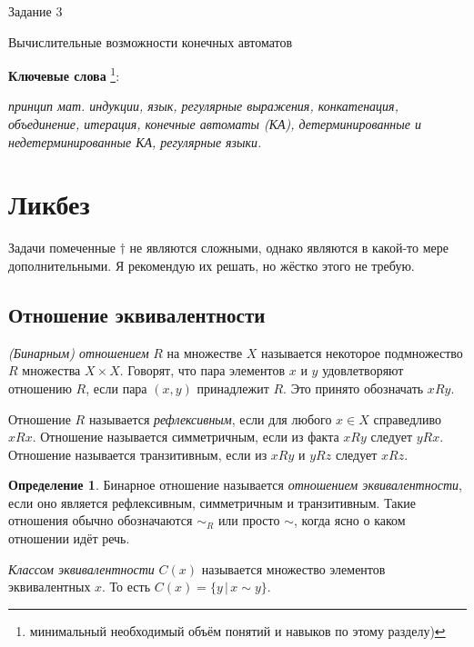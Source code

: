 \documentclass[12pt]{article}
\theoremstyle{definiton}
\theoremstyle{definition}
\theoremstyle{definition}
\newtheorem{Def}{Определение}
\begin{document}
	\centerline{\LARGE Задание 3}

	\medskip

	\centerline{\Large Вычислительные возможности конечных автоматов}

	\bigskip

	


	{\bf Ключевые слова }\footnote{минимальный необходимый объём понятий и навыков по
	этому разделу)}:{\em принцип мат. индукции, язык, регулярные выражения, конкатенация, объединение, итерация,  
	конечные автоматы (КА), детерминированные и недетерминированные КА, регулярные языки.

	}
	
	\setcounter{section}{-1}
	\section{Ликбез}
		Задачи помеченные $\dagger$ не являются сложными, однако являются в какой-то мере дополнительными. Я рекомендую их решать, но жёстко этого не требую.
		\subsection{Отношение эквивалентности}

		\emph{(Бинарным) отношением} $R$ на множестве $X$ называется некоторое подмножество $R$ множества $ X\times X$.
		Говорят, что пара элементов $x$ и $y$ удовлетворяют отношению $R$, если пара $(x,y)$ принадлежит $R$. Это принято обозначать $xRy$.


			Отношение $R$ называется \emph{рефлексивным}, если для любого $x \in X$ справедливо $xRx$. Отношение называется симметричным, если из факта $xRy$ следует $yRx$. Отношение называется транзитивным, если из $xRy$ и $yRz$ следует $xRz$.

		\begin{Def}
			Бинарное отношение называется \emph{отношением эквивалентности}, если оно является рефлексивным, симметричным и транзитивным. Такие отношения обычно обозначаются $\sim_R$ или просто $\sim$, когда ясно о каком отношении идёт речь.
		\end{Def}

		\emph{Классом эквивалентности} $C(x)$ называется множество элементов эквивалентных $x$. То есть $C(x) = \{y\,|\, x \sim y \}$.
\end{document}

